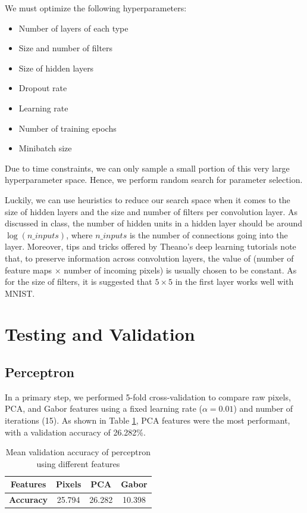 \documentclass{acm_proc_article-sp}
\begin{document}
We must optimize the following hyperparameters: 
\begin{itemize}
\item Number of layers of each type
\item Size and number of filters 
\item Size of hidden layers 
\item Dropout rate 
\item Learning rate 
\item Number of training epochs
\item Minibatch size
\end{itemize}

Due to time constraints, we can only sample a small portion of this very large hyperparameter space. Hence, we perform random search for parameter selection.

Luckily, we can use heuristics to reduce our search space when it comes to the size of hidden layers and the size and number of filters per convolution layer. As discussed in class, the number of hidden units in a hidden layer should be around $\log(n\_inputs)$, where $n\_inputs$ is the number of connections going into the layer. Moreover, tips and tricks offered by Theano's deep learning tutorials note that, to preserve information across convolution layers, the value of (number of feature maps $\times$ number of incoming pixels) is usually chosen to be constant. As for the size of filters, it is suggested that $5 \times 5$ in the first layer works well with MNIST. \cite{Theano-tut}


\section{Testing and Validation}%

\subsection{Perceptron}
In a primary step, we performed 5-fold cross-validation to compare raw pixels, PCA, and Gabor features using a fixed learning rate ($\alpha = 0.01$) and number of iterations (15). As shown in Table \ref{tab:perc-features}, PCA features were the most performant, with a validation accuracy of 26.282\%.
\begin{table}[h!]
  \centering
  \begin{tabular}{|c||c|c|c| }
    \hline
    {\bfseries Features} & Pixels & PCA & Gabor \\
    \hline
    {\bfseries Accuracy} & 25.794 & 26.282 & 10.398 \\
    \hline
  \end{tabular}
  \caption{Mean validation accuracy of perceptron using different features}
  \label{tab:perc-features}
\end{table}
\end{document}
